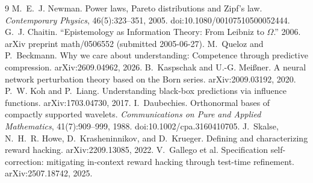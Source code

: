 \documentclass[11pt]{article}
\begin{document}
\begin{thebibliography}{9}
M.~E.~J. Newman. Power laws, Pareto distributions and Zipf's law.
\emph{Contemporary Physics}, 46(5):323--351, 2005. doi:10.1080/00107510500052444.
G.~J. Chaitin. ``Epistemology as Information Theory: From Leibniz to $\Omega$.''
2006. arXiv preprint math/0506552 (submitted 2005-06-27).
M.~Queloz and P.~Beckmann. Why we care about understanding: Competence through
predictive compression. arXiv:2609.04962, 2026.
B.~Kaspschak and U.-G. Meißner. A neural network perturbation theory based on
the Born series. arXiv:2009.03192, 2020.
P.~W. Koh and P.~Liang. Understanding black-box predictions via influence
functions. arXiv:1703.04730, 2017.
I.~Daubechies. Orthonormal bases of compactly supported wavelets.
\emph{Communications on Pure and Applied Mathematics}, 41(7):909--999, 1988.
doi:10.1002/cpa.3160410705.
J.~Skalse, N.~H.~R. Howe, D.~Krasheninnikov, and D.~Krueger. Defining and
characterizing reward hacking. arXiv:2209.13085, 2022.
V.~Gallego et al. Specification self-correction: mitigating in-context reward
hacking through test-time refinement. arXiv:2507.18742, 2025.
\end{thebibliography}
\end{document}
